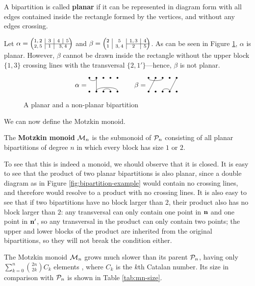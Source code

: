 \begin{definition}
  \label{def:planar}
  A bipartition is called \textbf{planar} if it can be represented in diagram
  form with all edges contained inside the rectangle formed by the vertices, and
  without any edges crossing.
\end{definition}

\begin{example}
  Let $\alpha = \bipart{c|c|c|c}{2-4}{1,2 &3 &4 &5}{2,5 &1 &\mc2{c}{3,4}}$ and
  $\beta = \bipart{c|c|c|c}{3-4}{2 &5 &1,3 &4}{1 &3,4 &2 &5}$.  As can be seen
  in Figure \ref{fig:planar}, $\alpha$ is planar.  However, $\beta$ cannot be
  drawn inside the rectangle without the upper block $\{1,3\}$ crossing lines
  with the transversal $\{2, 1'\}$---hence, $\beta$ is not planar.
\end{example}

\begin{figure}[h]
  \centering
  $$\alpha = \bipartdiag{\tc12\tv22\bC25 \bc34} \qquad
  \beta = \bipartdiag{\tc13 \tv21 \tv54\bc34}$$
  \caption{A planar and a non-planar bipartition}
  \label{fig:planar}
\end{figure}

We can now define the Motzkin monoid.

\begin{definition}
  \label{def:motzkin}
  The \textbf{Motzkin monoid} $\mathcal{M}_n$ is the submonoid of $\mathcal{P}_n$ consisting
  of all planar bipartitions of degree $n$ in which every block has size $1$ or
  $2$.
\end{definition}

To see that this is indeed a monoid, we should observe that it is closed.  It is
easy to see that the product of two planar bipartitions is also planar, since a
double diagram as in Figure \ref{fig:bipartition-example} would contain no
crossing lines, and therefore would resolve to a product with no crossing lines.
It is also easy to see that if two bipartitions have no block larger than $2$,
their product also has no block larger than $2$: any transversal can only
contain one point in $\mathbf{n}$ and one point in $\mathbf{n}'$, so any transversal in the
product can only contain two points; the upper and lower blocks of the product
are inherited from the original bipartitions, so they will not break the
condition either.

The Motzkin monoid $\mathcal{M}_n$ grows much slower than its parent $\mathcal{P}_n$, having
only $\sum_{k=0}^n \binom{2n}{2k}C_k$ elements \cite[A026945]{oeis}, where $C_k$
is the $k$th Catalan number.  Its size in comparison with $\mathcal{P}_n$ is
shown in Table \ref{tab:mn-size}.

